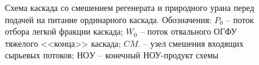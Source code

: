 \begin{figure}[ht]
  \caption{Схема каскада со смешением регенерата и природного урана перед подачей на питание ординарного каскада. Обозначения: $P_0$ -- поток отбора легкой фракции каскада; $W_0$ -- поток отвального ОГФУ тяжелого <<конца>> каскада; $CM.$ -- узел смешения входящих сырьевых потоков; $НОУ$ -- конечный НОУ-продукт схемы}\label{o3}
\end{figure}

